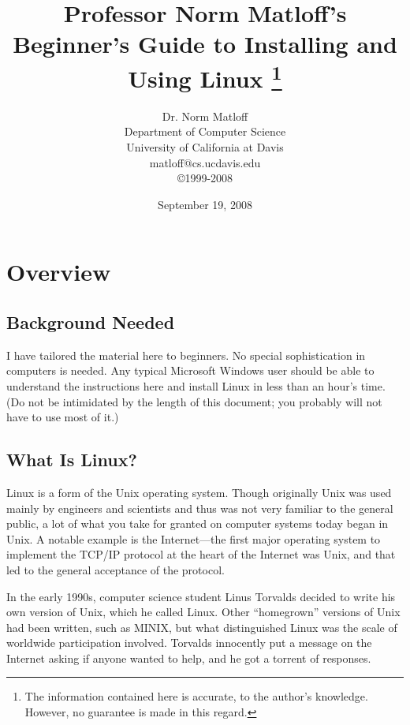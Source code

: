 \documentclass[11pt]{article}
\begin{document}
\title{Professor Norm Matloff's Beginner's Guide to Installing and
Using Linux
\thanks{The information contained here is accurate, to the author's
knowledge.  However, no guarantee is made in this regard.}
}

\author{
Dr. Norm Matloff \\
Department of Computer Science \\
University of California at Davis \\
matloff@cs.ucdavis.edu \\
\copyright{1999-2008} }
\date{September 19, 2008} 

\maketitle

\tableofcontents{}

\newpage

\section{Overview}

\subsection{Background Needed}

I have tailored the material here to beginners. No special
sophistication in computers is needed. Any typical Microsoft Windows
user should be able to understand the instructions here and install
Linux in less than an hour's time. (Do not be intimidated by the length
of this document; you probably will not have to use most of it.)

\subsection{What Is Linux?}

Linux is a form of the Unix operating system.  Though originally Unix
was used mainly by engineers and scientists and thus was not very
familiar to the general public, a lot of what you take for granted on
computer systems today began in Unix.  A notable example is the
Internet---the first major operating system to implement the
TCP/IP protocol at the heart of the Internet was Unix, and that led to
the general acceptance of the protocol.

In the early 1990s, computer science student Linus Torvalds decided to
write his own version of Unix, which he called Linux.  Other
``homegrown'' versions of Unix had been written, such as MINIX, but what
distinguished Linux was the scale of worldwide participation involved.
Torvalds innocently put a message on the Internet asking if anyone
wanted to help, and he got a torrent of responses.
\end{document}
